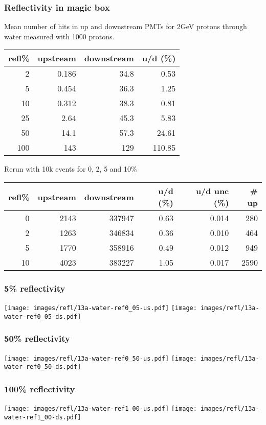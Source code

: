 \documentclass[xcolor=dvipsnames]{beamer}
\begin{document}
\begin{frame}
  \frametitle{Reflectivity in magic box}

  Mean number of hits in up and downstream PMTs for 2GeV protons
  through water measured with 1000 protons.

\begin{center}
\begin{tabular}{rrrr}
\hline
refl\% & upstream & downstream & u/d (\%)\\
\hline
2 & 0.186 & 34.8 & 0.53\\
5 & 0.454 & 36.3 & 1.25\\
10 & 0.312 & 38.3 & 0.81\\
25 & 2.64 & 45.3 & 5.83\\
50 & 14.1 & 57.3 & 24.61\\
100 & 143 & 129 & 110.85\\
\hline
\end{tabular}
\end{center}

Rerun with 10k events for 0, 2, 5 and 10\%

\begin{center}
\begin{tabular}{rrrrrr}
\hline
refl\% & upstream & downstream & u/d  (\%) & u/d unc (\%) & \# up\\
\hline
0 & 2143 & 337947 & 0.63 & 0.014 & 280\\
2 & 1263 & 346834 & 0.36 & 0.010 & 464\\
5 & 1770 & 358916 & 0.49 & 0.012 & 949\\
10 & 4023 & 383227 & 1.05 & 0.017 & 2590\\
\hline
\end{tabular}
\end{center}

\end{frame}

\begin{frame}[fragile]
\frametitle{5\% reflectivity}
\texttt{[image: images/refl/13a-water-ref0\_05-us.pdf]}
\texttt{[image: images/refl/13a-water-ref0\_05-ds.pdf]}
\end{frame}
\begin{frame}[fragile]
\frametitle{50\% reflectivity}
\texttt{[image: images/refl/13a-water-ref0\_50-us.pdf]}
\texttt{[image: images/refl/13a-water-ref0\_50-ds.pdf]}
\end{frame}
\begin{frame}[fragile]
\frametitle{100\% reflectivity}
\texttt{[image: images/refl/13a-water-ref1\_00-us.pdf]}
\texttt{[image: images/refl/13a-water-ref1\_00-ds.pdf]}
\end{frame}
\end{document}
